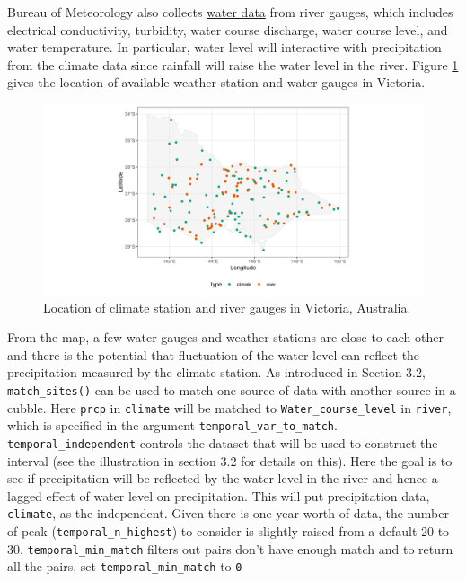 \documentclass[
]{jss}
\begin{document}
Bureau of Meteorology also collects
\href{http://www.bom.gov.au/metadata/catalogue/19115/ANZCW0503900528?template=full}{water
data} from river gauges, which includes electrical conductivity,
turbidity, water course discharge, water course level, and water
temperature. In particular, water level will interactive with
precipitation from the climate data since rainfall will raise the water
level in the river. Figure \ref{fig:matching-map} gives the location of
available weather station and water gauges in Victoria.

\begin{CodeChunk}
\begin{figure}

{\centering \includegraphics[width=1\linewidth]{figures/matching-map} 

}

\caption[Location of climate station and river gauges in Victoria, Australia]{Location of climate station and river gauges in Victoria, Australia.}\label{fig:matching-map}
\end{figure}
\end{CodeChunk}

From the map, a few water gauges and weather stations are close to each
other and there is the potential that fluctuation of the water level can
reflect the precipitation measured by the climate station. As introduced
in Section 3.2, \texttt{match\_sites()} can be used to match one source
of data with another source in a cubble. Here \texttt{prcp} in
\texttt{climate} will be matched to \texttt{Water\_course\_level} in
\texttt{river}, which is specified in the argument
\texttt{temporal\_var\_to\_match}. \texttt{temporal\_independent}
controls the dataset that will be used to construct the interval (see
the illustration in section 3.2 for details on this). Here the goal is
to see if precipitation will be reflected by the water level in the
river and hence a lagged effect of water level on precipitation. This
will put precipitation data, \texttt{climate}, as the independent. Given
there is one year worth of data, the number of peak
(\texttt{temporal\_n\_highest}) to consider is slightly raised from a
default 20 to 30. \texttt{temporal\_min\_match} filters out pairs don't
have enough match and to return all the pairs, set
\texttt{temporal\_min\_match} to \texttt{0}
\end{document}
